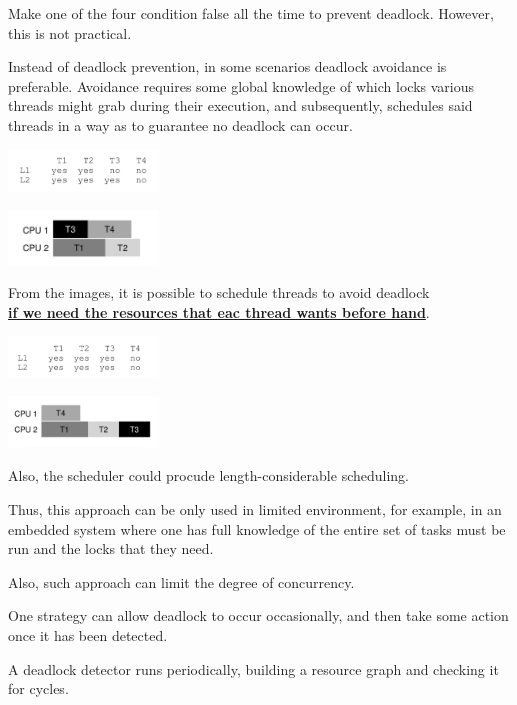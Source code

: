 
    Make one of the four condition false all the time to prevent deadlock. However,
    this is not practical. 


    Instead of deadlock prevention, in some scenarios deadlock avoidance is preferable.
    Avoidance requires some global knowledge of which locks various 
    threads might grab during their execution, and subsequently,
    schedules said threads in a way as to guarantee no deadlock can occur.


    \includegraphics[width=0.3\textwidth]{chapters/Cucurrency/Cucurrency/schedule_avoid_1.png}

    \includegraphics[width=0.3\textwidth]{chapters/Cucurrency/Cucurrency/good_schedule_1.png}


    From the images, it is possible to schedule threads to avoid deadlock\\
    \underline{\textbf{ if we need the resources that eac thread wants before hand}}.

    \includegraphics[width=0.3\textwidth]{chapters/Cucurrency/Cucurrency/deadlock_avoid_2.png}

    \includegraphics[width=0.3\textwidth]{chapters/Cucurrency/Cucurrency/schedule_2.png}

    Also, the scheduler could procude length-considerable scheduling.

    Thus, this approach can be only used in limited environment, for example,
    in an embedded system where one has full knowledge of the entire
    set of tasks must be run and the locks that they need.

    Also, such approach can limit the degree of concurrency.


    One strategy can allow deadlock to occur occasionally, and then take some 
    action once it has been detected.

    A deadlock detector runs periodically,
     building a resource graph and checking it for cycles.